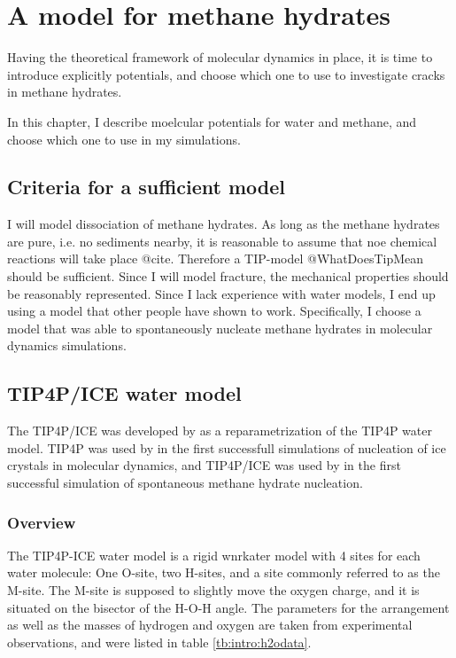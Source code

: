 \chapter{A model for methane hydrates}
Having the theoretical framework of molecular dynamics in place, it is time to introduce explicitly potentials, and choose which one to use to investigate cracks in methane hydrates. 

In this chapter, I describe moelcular potentials for water and methane, and choose which one to use in my simulations.  

\section{Criteria for a sufficient model}
I will model dissociation of methane hydrates. As long as the methane hydrates are pure, i.e. no sediments nearby, it is reasonable to assume that noe chemical reactions will take place @cite. Therefore a TIP-model @WhatDoesTipMean should be sufficient. Since I will model fracture, the mechanical properties should be reasonably represented. Since I lack experience with water models, I end up using a model that other people have shown to work. Specifically, I choose a model that was able to spontaneously nucleate methane hydrates in molecular dynamics simulations. 

\section{TIP4P/ICE water model}
The TIP4P/ICE was developed by \citet{Abascal2005} as a reparametrization of the TIP4P water model. TIP4P was used by \citet{Matsumoto2002} in the first successfull simulations of nucleation of ice crystals in molecular dynamics, and TIP4P/ICE was used by \citet{Walsh2009} in the first successful simulation of spontaneous methane hydrate nucleation. 

\subsection{Overview}
The TIP4P-ICE water model is a rigid wnrkater model with 4 sites for each water molecule: One O-site, two H-sites, and a site commonly referred to as the M-site. The M-site is supposed to slightly move the oxygen charge, and it is situated on the bisector of the H-O-H angle. The parameters for the arrangement as well as the masses of hydrogen and oxygen are taken from experimental observations, and were listed in table \ref{tb:intro:h2odata}.

